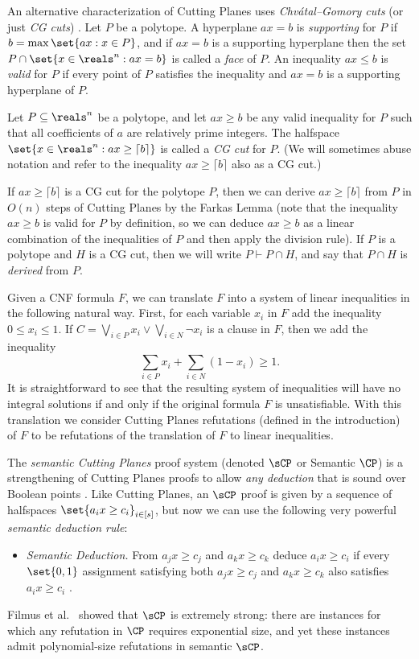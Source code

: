 An alternative characterization of Cutting Planes uses
\emph{Chv\'{a}tal--Gomory cuts} (or just \emph{CG cuts}) \cite{CookCT87, Chvatal73a}.
Let $P$ be a polytope.
A hyperplane $ax = b$ is \emph{supporting} for $P$ if $b = \max \set{ax : x \in P}$, and if $ax = b$ is a supporting hyperplane then the set $P \cap \set{x \in \reals^n : ax = b}$ is called a \emph{face} of $P$.
An inequality $ax \leq b$ is \emph{valid} for $P$ if every point of $P$ satisfies the inequality and $ax = b$ is a supporting hyperplane of $P$.
\begin{definition}\label{def:cg-cut}
	Let $P \subseteq \reals^n$ be a polytope, and let $ax \geq b$ be any valid inequality for $P$ such that all coefficients of $a$ are relatively prime integers.
	The halfspace $\set{x \in \reals^n : ax \geq \lceil b \rceil}$ is called a \emph{CG cut} for $P$. (We will sometimes abuse notation and refer to the inequality $ax \geq \lceil b \rceil$ also as a CG cut.)
\end{definition}
If $ax \geq \lceil b \rceil$ is a CG cut for the polytope $P$, then we can derive $ax \geq \lceil b \rceil$ from $P$ in $O(n)$ steps of Cutting Planes by
the  %
Farkas Lemma (note that the inequality $ax \geq b$ is valid for $P$ by definition, so we can deduce $ax \geq b$ as a linear combination of the inequalities of $P$ and then apply the division rule).
If $P$ is a polytope and $H$ is a CG cut, then we will write $P \vdash P \cap H$, and say that $P \cap H$ is \emph{derived} from $P$.


Given a CNF formula $F$, we can translate $F$ into a system of linear inequalities in the following natural way.
First, for each variable $x_i$ in $F$ add the inequality $0 \leq x_i \leq 1$.
If $C = \bigvee_{i \in P} x_i \vee \bigvee_{i \in N} \neg x_i$ is a clause in $F$, then we add the inequality \[\sum_{i \in P} x_i + \sum_{i \in N} (1-x_i) \geq 1. \]
It is straightforward to see that the resulting system of inequalities will have no integral solutions if and only if the original formula $F$ is unsatisfiable.
With this translation we consider Cutting Planes refutations (defined in the introduction) of $F$ to be refutations of the translation of $F$ to linear inequalities.



The \emph{semantic Cutting Planes} proof system (denoted $\sCP$ or Semantic $\CP$) is a strengthening of Cutting Planes proofs to allow \emph{any deduction} that is sound over Boolean points \cite{BonetPR97}.
Like Cutting Planes, an $\sCP$ proof is given by a sequence of halfspaces $\set{a_ix \geq c_i}_{i \in [s]}$, but now we can use the following very powerful \emph{semantic deduction rule}:
\begin{itemize}
	\item \emph{Semantic Deduction.} From $a_j x \geq c_j$ and $a_k x \geq c_k$ deduce $a_i x \geq c_i$ if every $\set{0,1}$ assignment satisfying both $a_jx \geq c_j$ and $a_k x \geq c_k$  also satisfies $a_ix \geq c_i$ .
\end{itemize}
Filmus et al.~\cite{FilmusHL16} showed that $\sCP$ is extremely strong: there are instances for which any refutation in $\CP$ requires exponential size, and yet these instances admit  polynomial-size refutations in semantic $\sCP$. 

